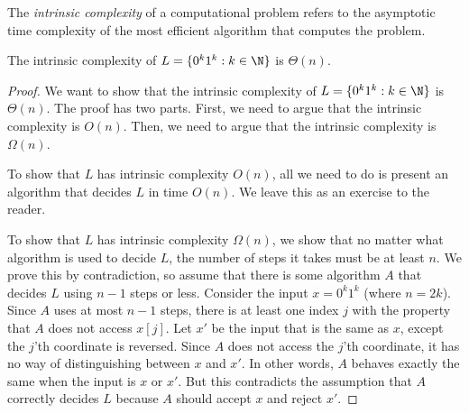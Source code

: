 \begin{note}
\label{note:Intrinsic-complexity}
The \emph{intrinsic complexity} of a computational problem refers to the asymptotic time complexity of the most efficient algorithm that computes the problem.

\end{note}

\begin{flex}
\label{grp:proposition:Intrinsic-complexity-of-0k1k-:-k-in-N}

\begin{proposition}
\label{proposition:Intrinsic-complexity-of-0k1k-:-k-in-N}
The intrinsic complexity of $L = \{0^k1^k : k \in \N\}$ is $\Theta(n)$.

\end{proposition}

\begin{proof}
\label{prf:time-complexity::want}
We want to show that the intrinsic complexity of $L = \{0^k1^k : k \in \N\}$ is $\Theta(n)$. The proof has two parts. First, we need to argue that the intrinsic complexity is $O(n)$. Then, we need to argue that the intrinsic complexity is $\Omega(n)$.

To show that $L$ has intrinsic complexity $O(n)$, all we need to do is present an algorithm that decides $L$ in time $O(n)$. We leave this as an exercise to the reader.

To show that $L$ has intrinsic complexity $\Omega(n)$, we show that no matter what algorithm is used to decide $L$, the number of steps it takes must be at least $n$. We prove this by contradiction, so assume that there is some algorithm $A$ that decides $L$ using $n-1$ steps or less. Consider the input $x = 0^k1^k$ (where $n = 2k$). Since $A$ uses at most $n-1$ steps, there is at least one index $j$ with the property that $A$ does not access $x[j]$. Let $x'$ be the input that is the same as $x$, except the $j$'th coordinate is reversed. Since $A$ does not access the $j$'th coordinate, it has no way of distinguishing between $x$ and $x'$. In other words, $A$ behaves exactly the same when the input is $x$ or $x'$. But this contradicts the assumption that $A$ correctly decides $L$ because $A$ should accept $x$ and reject $x'$. 

\end{proof}
\end{flex}

